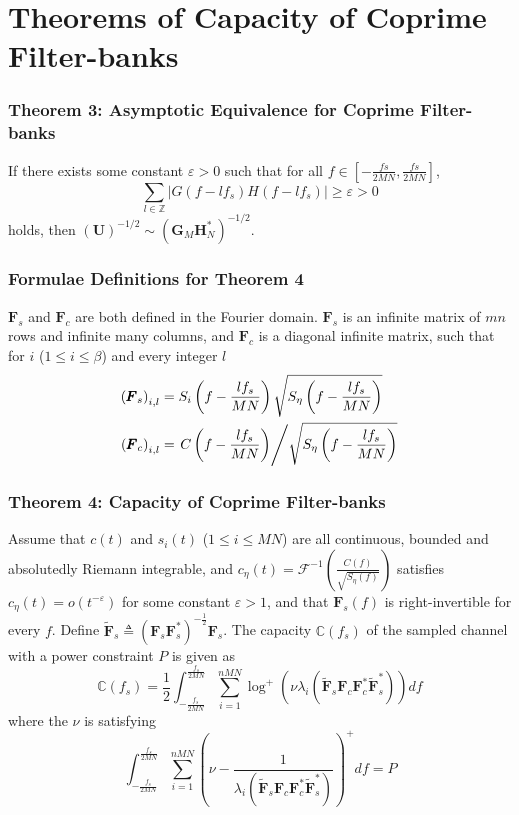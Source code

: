 \documentclass{beamer}
\begin{document}

\section{Theorems of Capacity of Coprime Filter-banks}

\begin{frame}
\frametitle{Theorem 3: Asymptotic Equivalence for Coprime Filter-banks}
\begin{block}{}
  If there exists some constant $\varepsilon>0$ such that for all $f\in\left[-\frac{fs}{2MN}, \frac{fs}{2MN}\right]$,
  \begin{equation}
    \sum_{l\in\mathbb{Z}}|G(f-lf_s)H(f-lf_s)|\geq\varepsilon>0
  \end{equation}
  holds, then $(\pmb{U})^{-1/2}\sim(\pmb{G}_M\pmb{H}^*_N)^{-1/2}$.
\end{block}
\end{frame}

\begin{frame}
\frametitle{Formulae Definitions for Theorem 4}
$\pmb{F}_s$ and $\pmb{F}_c$ are both defined in the Fourier domain. $\pmb{F}_s$ is an infinite matrix of $mn$ rows and infinite many columns, and $\pmb{F}_c$ is a diagonal infinite matrix, such that for $i$ ($1\leq i\leq\beta$) and every integer $l$
\begin{align}
  \left(\pmb{F}_s\right)_{i,l} &= S_i\left(f-\frac{lf_s}{MN}\right)\sqrt{S_\eta\left(f-\frac{lf_s}{MN}\right)}\\
  \left(\pmb{F}_c\right)_{i,l} &= \left.C\left(f-\frac{lf_s}{MN}\right)\middle/\sqrt{S_\eta\left(f-\frac{lf_s}{MN}\right)}\right.
\end{align}
\end{frame}

\begin{frame}
\frametitle{Theorem 4: Capacity of Coprime Filter-banks}
\begin{block}{}
  Assume that $c(t)$ and $s_i(t)$ ($1\leq i\leq MN$) are all continuous, bounded and absolutedly Riemann integrable, and $c_\eta(t)=\mathscr{F}^{-1}\left(\frac{C(f)}{\sqrt{S_\eta(f)}}\right)$ satisfies $c_\eta(t)=o(t^{-\varepsilon})$ for some constant $\varepsilon>1$, and that $\pmb{F}_s(f)$ is right-invertible for every $f$. Define $\tilde{\pmb{F}}_s\triangleq (\pmb{F}_s\pmb{F}_s^*)^{-\frac{1}{2}}\pmb{F}_s$. The capacity $\mathbb{C}(f_s)$ of the sampled channel with a power constraint $P$ is given as
  \begin{equation}
    \mathbb{C}(f_s)  =\frac{1}{2}\int_{-\frac{f_s}{2MN}}^{\frac{f_s}{2MN}}\sum_{i=1}^{nMN}\log^+\left(\nu\lambda_i\left(\tilde{\pmb{F}}_{s}\pmb{F}_{c}\pmb{F}_{c}^*\tilde{\pmb{F}}_{s}^*\right)\right)df
  \end{equation}
  where the $\nu$ is satisfying
  \begin{equation}
    \int_{-\frac{f_s}{2MN}}^{\frac{f_s}{2MN}}\sum_{i=1}^{nMN}\left(\nu - \frac{1}{\lambda_i\left(\tilde{\pmb{F}}_{s}\pmb{F}_{c}\pmb{F}_{c}^*\tilde{\pmb{F}}_{s}^*\right)}\right)^+df = P
  \end{equation}
\end{block}
\end{frame}
\end{document}

